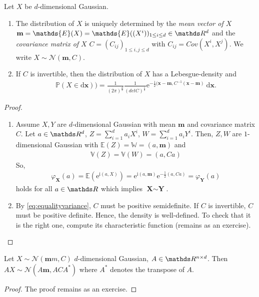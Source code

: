 \begin{thm}
Let $X$ be $d$-dimensional Gaussian.
\begin{enumerate}[label=\alph*)]
\item The distribution of $X$ is uniquely determined by the \emph{mean vector of $X$} $\textbf{m}=\mathds{E}(X)=\mathds{E}((X^i))_{1\leq i\leq d} \in \Rd$ and the \emph{covariance matrix of $X$} $C=(C_{ij})_{1\leq i,j\leq d}$ with $C_{ij}=Cov(X^i,X^j)$.
We write $X \sim \mathcal{N}(\textbf{m},C)$.
\item If $C$ is invertible, then the distribution of $X$ has a Lebesgue-density and
\begin{align*}
\mathds{P}(X \in \mathrm{d}\textbf{x}))=\frac{1}{(2 \pi)^{\frac{d}{2}}} \frac{1}{(det C)^{\frac{1}{2}}} \mathrm{e}^{-\frac{1}{2}(\textbf{x}-\textbf{m},C^{-1}(\textbf{x}-\textbf{m})}~\mathrm{d}\textbf{x}.
\end{align*}
\end{enumerate}
\begin{proof}
\begin{enumerate}[label=\alph*)]
\item Assume $X,Y$ are $d$-dimensional Gaussian with mean $\textbf{m}$ and covariance matrix $C$.
Let $a\in \Rd$, $Z=\sum_{i=1}^d a_iX^i$, $W=\sum_{i=1}^d a_i Y^i$.
Then, $Z,W$ are $1$-dimensional Gaussian with $\mathds{E}(Z)=\mathds{W}=(a,\textbf{m})$ and
\begin{align}\label{eq:equalityvariance}
\mathds{V}(Z)=\mathds{V}(W)=(a,Ca)
\end{align}
So,
\begin{align*}
\varphi_{\textbf{X}}(a)=\mathds{E}\left(\mathrm{e}^{\mathrm{i}(a,X)}\right)=\mathrm{e}^{\mathrm{i}(a,\textbf{m})}\mathrm{e}^{-\frac{1}{2}(a,Ca)}=\varphi_\textbf{Y}(a)
\end{align*}
holds for all $a\in\R$ which implies $\textbf{X}\sim \textbf{Y}$.
\item By \eqref{eq:equalityvariance}, $C$ must be positive semidefinite. If $C$ is invertible, $C$ must be positive definite.
Hence, the density is well-defined.
To check that it is the right one, compute its characteristic function (remains as an exercise). \qedhere
\end{enumerate}
\end{proof}
\end{thm}

\begin{prop}
Let $X \sim \mathcal{N}(\textbf{m}m,C)$ $d$-dimensional Gaussian, $A \in \R^{n\times d}$.
Then $AX\sim \mathcal{N}(A\textbf{m},ACA^\ast)$ where $A^\ast$ denotes the transpose of $A$.
\begin{proof}
The proof remains as an exercise.
\end{proof}
\end{prop}

